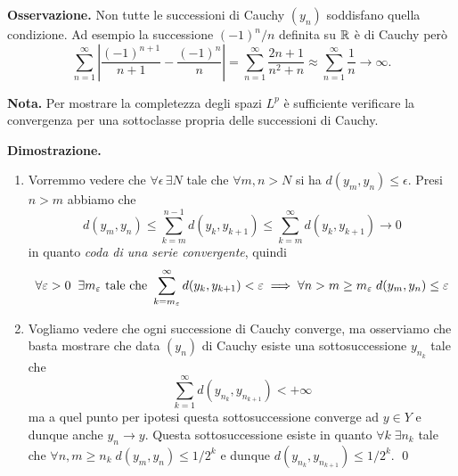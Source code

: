 \textbf{Osservazione.} Non tutte le successioni di Cauchy $(y_n)$ soddisfano quella condizione. Ad esempio la successione $(-1)^n / n$ definita su $\mathbb R$ è di Cauchy però
$$
\sum_{n=1}^\infty \left| \frac{(-1)^{n+1}}{n+1} - \frac{(-1)^n}{n} \right| 
= \sum_{n=1}^\infty \frac{2n + 1}{n^2 + n}
\approx \sum_{n=1}^\infty \frac{1}{n} \to \infty.
$$

\textbf{Nota.} Per mostrare la completezza degli spazi $L^p$ è sufficiente verificare la convergenza per una sottoclasse propria delle successioni di Cauchy.

\textbf{Dimostrazione.}
\begin{enumerate}
	\item Vorremmo vedere che $\forall \epsilon \, \exists N$ tale che $\forall m, n > N$ si ha $d(y_m, y_n) \leq \epsilon$. 
		Presi $n > m$ abbiamo che 
		$$
		d(y_m, y_n) \leq \sum_{k=m}^{n-1} d(y_k, y_{k+1}) \leq \sum_{k=m}^\infty d(y_k, y_{k+1}) \to 0
		$$
		in quanto \textit{coda di una serie convergente}, quindi 
		$$
		\forall \varepsilon > 0 \;\; \exists m_\varepsilon \text{ tale che } \sum_{k = m_\varepsilon}^\infty d(y_k, y_{k+1})< \varepsilon \implies \forall n > m \geq m_\varepsilon \; d(y_m, y_n) \leq \varepsilon
		$$ 

	\item
		Vogliamo vedere che ogni successione di Cauchy converge, ma osserviamo che basta mostrare che data $(y_n)$ di Cauchy esiste una sottosuccessione $y_{n_k}$ tale che
		$$
		\sum_{k=1}^\infty d(y_{n_k}, y_{n_{k+1}}) < +\infty
		$$
		ma a quel punto per ipotesi questa sottosuccessione converge ad $y \in Y$ e dunque anche $y_n \to y$. 
		Questa sottosuccessione esiste in quanto $\forall k \; \exists n_k$ tale che $\forall n, m \geq n_k \; d(y_m, y_n) \leq 1 /2 ^k$ e dunque $d(y_{n_k}, y_{n_{k+1}}) \leq 1 / 2^k$.
		\qed



\end{enumerate}



